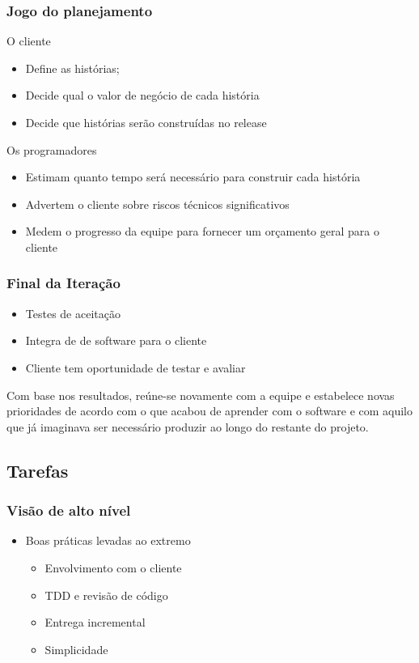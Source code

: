 \documentclass[10pt]{beamer}
\begin{document}
\begin{frame}
  \frametitle{Jogo do planejamento}
    \begin{block}{O cliente}
      \begin{itemize}%
        \item Define as histórias;
        \item Decide qual o valor de negócio de cada história
        \item Decide que histórias serão construídas no release
      \end{itemize}
    \end{block}
    \pause
    \begin{block}{Os programadores}
      \begin{itemize}%
        \item Estimam quanto tempo será necessário para construir cada história
        \item Advertem o cliente sobre riscos técnicos significativos
        \item Medem o progresso da equipe para fornecer um orçamento geral para o cliente
      \end{itemize}
    \end{block}
\end{frame}


\begin{frame}
  \frametitle{Final da Iteração}
  \begin{itemize}%
    \item Testes de aceitação
    \item Integra de de software para o cliente
    \item Cliente tem oportunidade de testar e avaliar
  \end{itemize}
  \begin{block}{}
Com base nos resultados, reúne-se novamente com a equipe e estabelece novas prioridades de acordo com o que acabou de aprender com o software e com aquilo que já imaginava ser necessário produzir ao longo do restante do projeto.
  \end{block}
\end{frame}



\subsection{Tarefas}


\begin{frame}
  \frametitle{Visão de alto nível}
  \begin{itemize}%
  \item Boas práticas levadas ao extremo
    \begin{itemize}
    \item Envolvimento com o cliente
    \item TDD e revisão de código
    \item Entrega incremental
    \item Simplicidade
    \end{itemize}
  \end{itemize}
\end{frame}
\end{document}
